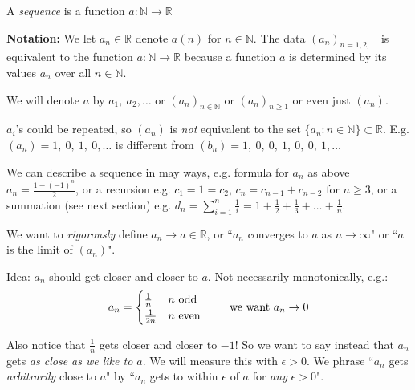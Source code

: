 \documentclass[twoside]{scrartcl}
\begin{document}
\begin{definition}
	A \emph{sequence} is a function $a:\mathbb{N} \to \mathbb{R}$
\end{definition}

\textbf{Notation:} We let $a_n \in \mathbb{R}$ denote $a(n)$ for $n \in \mathbb{N}$. The data $(a_n)_{n=1,2,\dots}$ is equivalent to the function $a:\mathbb{N} \to \mathbb{R}$ because a function $a$ is determined by its values $a_n$ over all $n \in \mathbb{N}$. 

We will denote $a$ by $a_1,~a_2,\dots$ or $(a_n)_{n\in\mathbb{N}}$ or $(a_n)_{n\geq 1}$ or even just $(a_n)$.\vspace*{5pt}

\begin{remark}
$a_i$'s could be repeated, so $(a_n)$ is \emph{not} equivalent to the set $\{a_n : n \in \mathbb{N}\}\subset \mathbb{R}$. E.g. $(a_n) = 1,~0,~1,~0,\dots$ is different from $(b_n) = 1,~0,~0,~1,~0,~0,~1,\dots$	
\end{remark}

We can describe a sequence in may ways, e.g. formula for $a_n$ as above $a_n = \frac{1-(-1)^n}{2}$, or a recursion e.g. $c_1 = 1 = c_2$, $c_n = c_{n-1} + c_{n-2}$ for $n\geq 3$, or a summation (see next section) e.g. $d_n = \sum_{i=1}^n \frac{1}{i} = 1 + \frac{1}{2} + \frac{1}{3} + \dots +\frac{1}{n}$.

We want to \emph{rigorously} define $a_n \to a \in \mathbb{R}$, or ``$a_n$ converges to $a$ as $n \to \infty$" or ``$a$ is the limit of $(a_n)$". 

Idea: $a_n$ should get closer and closer to $a$. Not necessarily monotonically, e.g.:
\[a_n = 
\begin{cases}
\frac{1}{n} & n \text{ odd}\\
\frac{1}{2n} & n \text{ even}	
\end{cases}
\hspace*{20pt}\text{ we want } a_n \to 0\]


\begin{center}
\end{center}
Also notice that $\frac{1}{n}$ gets closer and closer to $-1$! So we want to say instead that $a_n$ gets \emph{as close as we like to $a$}. We will measure this with $\epsilon >0$. We phrase ``$a_n$ gets \emph{arbitrarily} close to $a$" by ``$a_n$ gets to within $\epsilon$ of $a$ for \emph{any} $\epsilon >0$".\\
\end{document}
